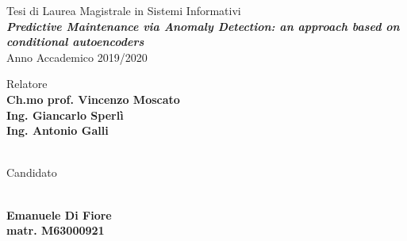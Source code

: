 \begin{titlepage}
\thispagestyle{empty}
\raggedright %


\vfill

{\large Tesi di Laurea Magistrale in Sistemi Informativi}
\\[1cm]
{\textbf{\textit{\LARGE Predictive Maintenance via Anomaly Detection: an approach based on conditional autoencoders}}}
\\[1cm]
{\large Anno Accademico 2019/2020}

\vfill


\begin{table}[h]
Relatore
\\
\textbf{Ch.mo prof. Vincenzo Moscato}
\\
\textbf{Ing. Giancarlo Sperlì}
\\
\textbf{Ing. Antonio Galli}
\\ \\
{\raggedright Candidato}
\\
\textbf{Emanuele Di Fiore}
\\
\textbf{matr. M63000921}
\end{table}

\end{titlepage}